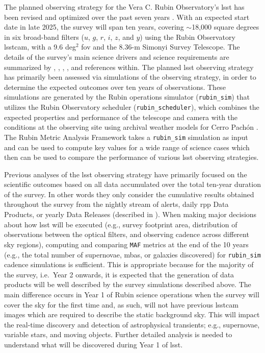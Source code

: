 \documentclass[preprintm,linenumbers]{aastex631}
\newcommand{\rubinsim}{\texttt{rubin\_sim}\xspace}
\newcommand{\rubinscheduler}{\texttt{rubin\_scheduler}\xspace}
\newcommand{\maf}{\texttt{MAF}\xspace}
\begin{document}
	The planned observing strategy for the Vera C. Rubin Observatory's \gls*{lsst} has been revised and optimized over the past seven years \citep{SCOC_Report_1,2022ApJS..258....1B, SCOC_Report_2,SCOC_Report_3}. 
 With an expected start date in late 2025, the survey will span ten years, covering $\sim$18,000 square degrees in six broad-band filters ($u$, $g$, $r$, $i$, $z$, and $y$) using the Rubin Observatory \gls*{lsstcam}, with a 9.6 deg$^2$ \gls*{fov} and the 8.36-m Simonyi Survey Telescope. The details of the survey's main science drivers and science requirements are summarized by \cite{lsstScienceBook2009}, \cite{lsstSRD}, \cite{2019ApJ...873..111I}, \cite{2022ApJS..258....1B}, and references within. 
 The planned \gls*{lsst} observing strategy has primarily been assessed via simulations of the observing strategy, in order to determine the expected outcomes over ten years of observations.
 These simulations are generated by the Rubin operations simulator (\rubinsim) that utilizes the Rubin Observatory scheduler (\rubinscheduler), which combines the expected properties and performance of the telescope and camera with the conditions at the observing site using archival weather models for Cerro Pach\'on \citep{2014SPIE.9150E..14C, 2014SPIE.9150E..15D, 2017arXiv170804058L, 2019AJ....157..151N, jones_r_lynne_2020_4048838}.
 The Rubin Metric Analysis Framework \citep[\maf; ][]{2014SPIE.9149E..0BJ} takes a \rubinsim simulation as input and can be used to compute key values for a wide range of science cases which then can be used to compare the performance of various \gls*{lsst} observing strategies.
	
	Previous analyses of the \gls*{lsst} observing strategy  \cite[e.g., ][]{lsstsciencecollaborationScienceDrivenOptimizationLSST2017, 2018Icar..303..181J,  2018arXiv181200515L, 2022ApJS..258....5A, 2022ApJS..263...23G, schwambTuningLegacySurvey2023,2023ApJS..268...11F} have primarily focused on the scientific outcomes based on all data accumulated over the total ten-year duration of the survey. In other words they only consider the cumulative results obtained throughout the survey from the nightly stream of alerts, daily \gls*{rpp}  Data Products, or yearly Data Releases (described in \cite{LSE-163}).  
 When making major decisions about how \gls*{lsst} will be executed (e.g., survey footprint area, distribution of observations between the optical filters, and observing cadence across different sky regions), computing and comparing \maf metrics at the end of the 10 years (e.g., the total number of supernovae, \glspl*{mba}, or galaxies discovered) for \rubinsim cadence simulations is sufficient. 
 This is appropriate because for the majority of the survey, i.e.\ Year 2 onwards, it is expected that the generation of data products will be well described by the survey simulations described above.
 The main difference occurs in Year 1 of Rubin science operations when the survey will cover the sky for the first time and, as such, will not have previous \gls*{lsstcam} images which are required to describe the static background sky. This will impact the real-time discovery and detection of astrophysical transients; e.g., supernovae, variable stars, and moving objects. Further detailed analysis is needed to understand what will be discovered during Year 1 of \gls*{lsst}. 
	
\end{document}
